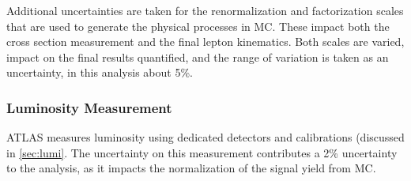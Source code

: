 Additional uncertainties are taken for the renormalization and factorization scales that are used to generate the physical processes in \ac{MC}. These impact both the cross section measurement and the final lepton kinematics. Both scales are varied, impact on the final results quantified, and the range of variation is taken as an uncertainty, in this analysis about 5\%. 

\subsubsection{Luminosity Measurement}
\ac{ATLAS} measures luminosity using dedicated detectors and calibrations (discussed in \autoref{sec:lumi}. The uncertainty on this measurement contributes a 2\% uncertainty to the analysis, as it impacts the normalization of the signal yield from \ac{MC}.




